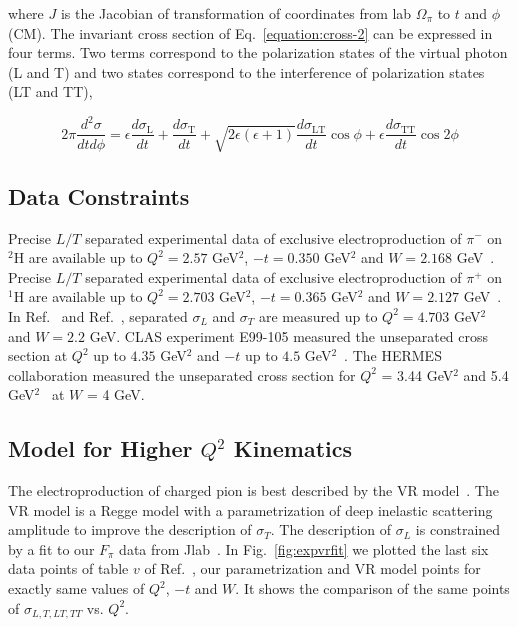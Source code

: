 where $J$ is the Jacobian of transformation of coordinates from lab $\Omega_{\pi}$ to $t$ and $\phi$ (CM). The invariant cross section 
of Eq.~\ref{equation:cross-2} can be expressed in four terms. Two terms correspond to the polarization states of the virtual 
photon (L and T) and two states correspond to the interference of polarization states (LT and TT),

\begin{equation}
  2\pi \frac{d^2 \sigma}{dt d\phi} =  \epsilon  \frac{d\sigma_{\mathrm{L}}}{dt} + \frac{d\sigma_{\mathrm{T}}}{dt} + 
  \sqrt{2\epsilon (\epsilon +1)} \frac{d\sigma_{\mathrm{LT}}}{dt} \cos{\phi} + \epsilon  \frac{d\sigma_{\mathrm{TT}}}{dt} \cos{2 \phi}
  \label{equation:cross-3}
\end{equation}

\subsection{Data Constraints}
Precise $L/T$ separated experimental data of exclusive electroproduction of $\pi^{-}$ on $^2$H are available up to $Q^2 = 2.57$ GeV$^2$, 
$-t = 0.350$ GeV$^2$ and $W = 2.168$ GeV~\cite{gmhuber-2}. Precise $L/T$ separated experimental data of exclusive electroproduction 
of $\pi^{+}$ on $^1$H are available up to $Q^2 = 2.703$ GeV$^2$, $-t = 0.365$ GeV$^2$ and $W = 2.127$ GeV~\cite{gmhuber}. In Ref.~\cite{hallc-1} 
and Ref.~\cite{hallc-2}, separated $\sigma_{L}$ and $\sigma_{T}$ are measured up to $Q^2 = 4.703$ GeV$^2$ and $W = 2.2$ GeV. CLAS 
experiment E99-105 measured the unseparated cross section at $Q^2$ up to $4.35$ GeV$^2$ and $-t$ up to $4.5$ GeV$^2$~\cite{park}. 
The HERMES collaboration measured the unseparated cross section for $Q^2$ = 3.44 GeV$^2$ and 5.4 GeV$^2$~\cite{hermes} at $W$ = 4 
GeV. 

\subsection{Model for Higher $Q^2$ Kinematics}
The electroproduction of charged pion is best described by the VR model~\cite{vr}. The VR model is a 
Regge model with a parametrization of deep inelastic scattering amplitude to improve the description of $\sigma_{T}$. The 
description of $\sigma_{L}$ is constrained by a fit to our $F_{\pi}$ data from Jlab~\cite{gmhuber}. In Fig.~\ref{fig:expvrfit} we plotted the 
last six data points of table $v$ of Ref.~\cite{gmhuber-2}, our parametrization and VR model points for exactly same 
values of $Q^2$, $-t$ and $W$. It shows the comparison of the same points of $\sigma_{L,T,LT,TT}$ vs. $Q^{2}$. 

